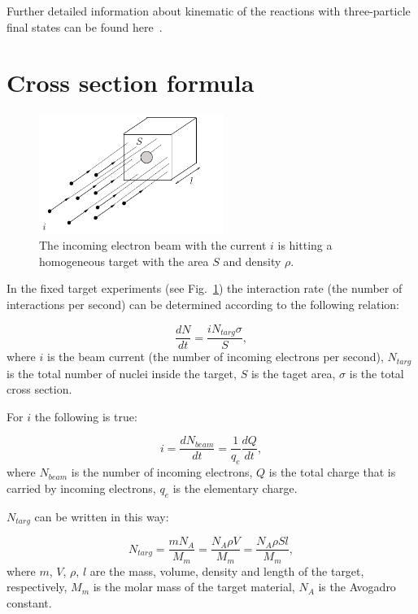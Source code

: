 Further detailed information about kinematic of the reactions with three-particle final states can be found here~\cite{Byckling:1971vca}.


\section{Cross section formula}
\label{cr_sec_formula}

\begin{figure}[htp]
\begin{center}
\includegraphics[width=6cm]{pictures/cross_sction/luminosity/luminosity_new.pdf}
\caption{\small The incoming electron beam with the current $i$ is hitting a homogeneous target with the area $S$ and density $\rho$.} \label{fig:cr_sec_Luminosity}
\end{center}
\end{figure}

In the fixed target experiments (see Fig.~\ref{fig:cr_sec_Luminosity}) the interaction rate (the number of interactions per second) can be determined according to the following relation:

\begin{equation}
\frac{dN}{dt}=\frac{iN_{targ}\sigma}{S},
\label{eq:cr_sec_rate}
\end{equation} 
where $i$ is the beam current (the number of incoming electrons per second), $N_{targ}$ is the total number of nuclei inside the target, $S$ is the taget area, $\sigma$ is the total cross section.

For $i$ the following is true:

\begin{equation}
i=\frac{dN_{beam}}{dt}=\frac{1}{q_{e}}\frac{dQ}{dt},
\label{eq:cr_sec_j}
\end{equation} 
where $N_{beam}$ is the number of incoming electrons, $Q$ is the total charge that is carried by incoming electrons, $q_{e}$ is the elementary charge.

$N_{targ}$ can be written in this way:

\begin{equation}
N_{targ}=\frac{mN_{A}}{M_{m}}=\frac{N_{A}\rho V}{M_{m}}=\frac{N_{A}\rho Sl}{M_{m}},
\label{eq:cr_sec_n_targ}
\end{equation} 
where $m$, $V$, $\rho$, $l$ are the mass, volume, density and length of the target, respectively, $M_{m}$ is the molar mass of the target material, $N_{A}$ is the Avogadro constant.


